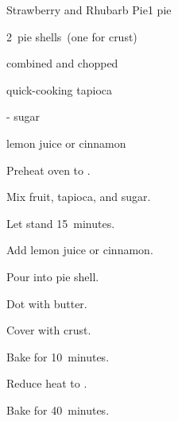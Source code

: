 \begin{recipe}{Strawberry and Rhubarb Pie}{}{1 pie}

\begin{ingredients}
\item 2~pie shells~(one for crust)
\item {} combined  and chopped 
\item \Tp{2\twothird} quick-cooking tapioca
\item \twothird{}- sugar
\item \Tp{1\half} lemon juice or \tp{\half} cinnamon
\end{ingredients}

\begin{directions}
\item Preheat oven to .
\item Mix fruit, tapioca, and sugar.
\item Let stand 15~minutes.
\item Add lemon juice or cinnamon.
\item Pour into pie shell.
\item Dot with butter.
\item Cover with crust.
\item Bake for 10~minutes.
\item Reduce heat to .
\item Bake for 40~minutes.
\end{directions}

\end{recipe}
